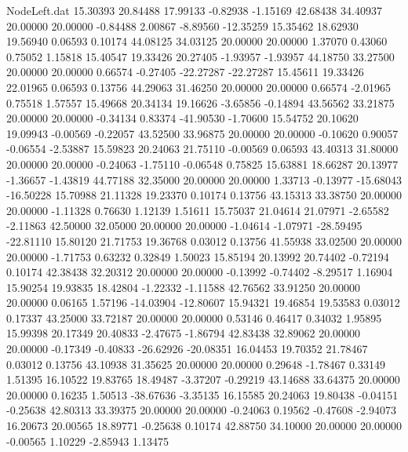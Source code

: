 \begin{filecontents}{NodeLeft.dat}
  15.30393   20.84488   17.99133    -0.82938   -1.15169   42.68438   34.40937   20.00000   20.00000   -0.84488    2.00867   -8.89560  -12.35259
  15.35462   18.62930   19.56940     0.06593    0.10174   44.08125   34.03125   20.00000   20.00000    1.37070    0.43060    0.75052    1.15818
  15.40547   19.33426   20.27405    -1.93957   -1.93957   44.18750   33.27500   20.00000   20.00000    0.66574   -0.27405  -22.27287  -22.27287
  15.45611   19.33426   22.01965     0.06593    0.13756   44.29063   31.46250   20.00000   20.00000    0.66574   -2.01965    0.75518    1.57557
  15.49668   20.34134   19.16626    -3.65856   -0.14894   43.56562   33.21875   20.00000   20.00000   -0.34134    0.83374  -41.90530   -1.70600
  15.54752   20.10620   19.09943    -0.00569   -0.22057   43.52500   33.96875   20.00000   20.00000   -0.10620    0.90057   -0.06554   -2.53887
  15.59823   20.24063   21.75110    -0.00569    0.06593   43.40313   31.80000   20.00000   20.00000   -0.24063   -1.75110   -0.06548    0.75825
  15.63881   18.66287   20.13977    -1.36657   -1.43819   44.77188   32.35000   20.00000   20.00000    1.33713   -0.13977  -15.68043  -16.50228
  15.70988   21.11328   19.23370     0.10174    0.13756   43.15313   33.38750   20.00000   20.00000   -1.11328    0.76630    1.12139    1.51611
  15.75037   21.04614   21.07971    -2.65582   -2.11863   42.50000   32.05000   20.00000   20.00000   -1.04614   -1.07971  -28.59495  -22.81110
  15.80120   21.71753   19.36768     0.03012    0.13756   41.55938   33.02500   20.00000   20.00000   -1.71753    0.63232    0.32849    1.50023
  15.85194   20.13992   20.74402    -0.72194    0.10174   42.38438   32.20312   20.00000   20.00000   -0.13992   -0.74402   -8.29517    1.16904
  15.90254   19.93835   18.42804    -1.22332   -1.11588   42.76562   33.91250   20.00000   20.00000    0.06165    1.57196  -14.03904  -12.80607
  15.94321   19.46854   19.53583     0.03012    0.17337   43.25000   33.72187   20.00000   20.00000    0.53146    0.46417    0.34032    1.95895
  15.99398   20.17349   20.40833    -2.47675   -1.86794   42.83438   32.89062   20.00000   20.00000   -0.17349   -0.40833  -26.62926  -20.08351
  16.04453   19.70352   21.78467     0.03012    0.13756   43.10938   31.35625   20.00000   20.00000    0.29648   -1.78467    0.33149    1.51395
  16.10522   19.83765   18.49487    -3.37207   -0.29219   43.14688   33.64375   20.00000   20.00000    0.16235    1.50513  -38.67636   -3.35135
  16.15585   20.24063   19.80438    -0.04151   -0.25638   42.80313   33.39375   20.00000   20.00000   -0.24063    0.19562   -0.47608   -2.94073
  16.20673   20.00565   18.89771    -0.25638    0.10174   42.88750   34.10000   20.00000   20.00000   -0.00565    1.10229   -2.85943    1.13475

\end{filecontents}
